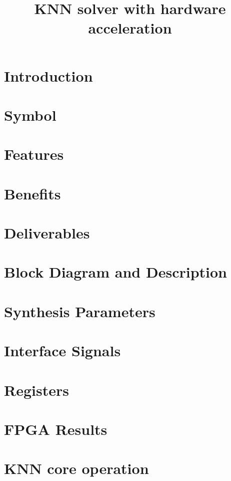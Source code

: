 \documentclass{../../submodules/TEX/document/ug/ug}
\title{KNN solver with hardware acceleration}
\begin{document}
\maketitle
\cleardoublepage
\tableofcontents
\listoftables
\listoffigures
\cleardoublepage

\section{Introduction}


\section{Symbol}


\section{\textcolor[rgb]{0,0,0}{Features}}

\clearpage

\section{\textcolor[rgb]{0,0,0}{Benefits}}


\section{\textcolor[rgb]{0,0,0}{Deliverables}}

\clearpage

\section{\textcolor[rgb]{0,0,0}{Block Diagram and Description}}

\clearpage

\section{\textcolor[rgb]{0,0,0}{Synthesis Parameters}}


\section{Interface Signals}


\section{Registers}


\section{\textcolor[rgb]{0,0,0}{FPGA Results}}


\section{\textcolor[rgb]{0,0,0}{KNN core operation}}





%
%
\end{document}
